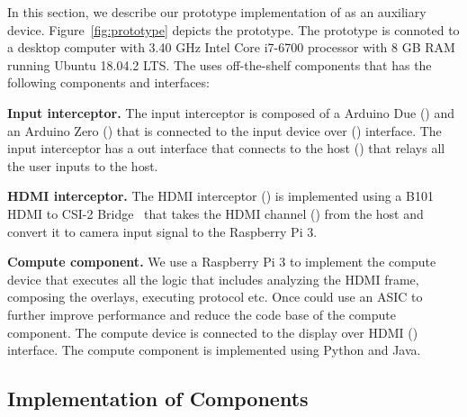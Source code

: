 In this section, we describe our prototype implementation of \name as an auxiliary device. Figure~\ref{fig:prototype} depicts the \name prototype. The prototype \device is connoted to a desktop computer with 3.40 GHz Intel Core i7-6700 processor with 8 GB RAM running Ubuntu 18.04.2 LTS. The \device uses off-the-shelf components that has the following components and interfaces:

\begin{mylist}

  \item \textbf{Input interceptor.} The input interceptor is composed of a Arduino Due (\three) and an Arduino Zero (\four) that is connected to the input device over \usb (\two) interface. The input interceptor has a \usb out interface that connects to the host (\five) that relays all the user inputs to the host. 

  \item \textbf{HDMI interceptor.} The HDMI interceptor (\seven) is implemented using a B101 HDMI to CSI-2 Bridge~\cite{b101} that takes the HDMI channel (\eight) from the host and convert it to camera input signal to the Raspberry Pi 3.  
  
      \item \textbf{Compute component.} We use a Raspberry Pi 3 to implement the compute device that executes all the \device logic that includes analyzing the HDMI frame, composing the overlays, executing \tls protocol etc. Once could use an ASIC to further improve performance and reduce the code base of the compute component. The compute device is connected to the display over HDMI (\nine) interface. The compute component is implemented using Python and Java.
\end{mylist}


\subsection{Implementation of \name Components}
\label{sec:prototype:impl}


